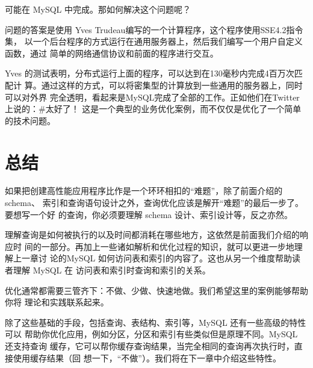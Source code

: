 可能在 MySQL 中完成。那如何解决这个问题呢？

问题的答案是使用 Yves Trudeau编写的一个计算程序，这个程序使用SSE4.2指令集，
以一个后台程序的方式运行在通用服务器上，然后我们编写一个用户自定义函数，通过
简单的网络通信协议和前面的程序进行交互。

Yves 的测试表明，分布式运行上面的程序，可以达到在130毫秒内完成4百万次匹配计
算。通过这样的方式，可以将密集型的计算放到一些通用的服务器上，同时可以对外界
完全透明，看起来是MySQL完成了全部的工作。正如他们在Twitter 上说的：#太好了！
这是一个典型的业务优化案例，而不仅仅是优化了一个简单的技术问题。

\section{总结}
如果把创建高性能应用程序比作是一个环环相扣的“难题”，除了前面介绍的schema、
索引和查询语句设计之外，查询优化应该是解开“难题”的最后一步了。要想写一个好
的查询，你必须要理解 schema 设计、索引设计等，反之亦然。

理解查询是如何被执行的以及时间都消耗在哪些地方，这依然是前面我们介绍的响应时
间的一部分。再加上一些诸如解析和优化过程的知识，就可以更进一步地理解上一章讨
论的MySQL 如何访问表和索引的内容了。这也从另一个维度帮助读者理解 MySQL 在
访问表和索引时查询和索引的关系。

优化通常都需要三管齐下：不做、少做、快速地做。我们希望这里的案例能够帮助你将
理论和实践联系起来。

除了这些基础的手段，包括查询、表结构、索引等，MySQL 还有一些高级的特性可以
帮助你优化应用，例如分区，分区和索引有些类似但是原理不同。MySQL 还支持查询
缓存，它可以帮你缓存查询结果，当完全相同的查询再次执行时，直接使用缓存结果（回
想一下，“不做”）。我们将在下一章中介绍这些特性。



